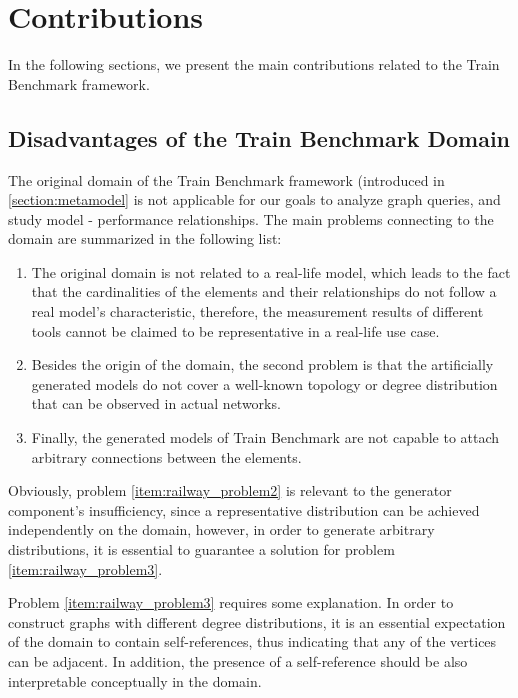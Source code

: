 \chapter{Contributions}

In the following sections, we present the main contributions related to the Train Benchmark framework.

\section{Disadvantages of the Train Benchmark Domain}\label{sec:railway}

The original domain of the Train Benchmark framework (introduced in \ref{section:metamodel} is not applicable for our goals to analyze graph queries, and study model - performance relationships. The main problems connecting to the domain are summarized in the following list:
\begin{enumerate}
	\item The original domain is not related to a real-life model, which leads to the fact that the cardinalities of the elements and their relationships do not follow a real model's characteristic, therefore, the measurement results of different tools cannot be claimed to be representative in a real-life use case. \label{item:railway_problem1}
	\item Besides the origin of the domain, the second problem is that the artificially generated models do not cover a well-known topology or degree distribution that can be observed in actual networks. \label{item:railway_problem2}
	\item Finally, the generated models of Train Benchmark are not capable to attach arbitrary connections between the elements. \label{item:railway_problem3}
\end{enumerate}

Obviously, problem \ref{item:railway_problem2} is relevant to the generator component's insufficiency, since a representative distribution can be achieved independently on the domain, however, in order to generate arbitrary distributions, it is essential to guarantee a solution for problem \ref{item:railway_problem3}.

Problem \ref{item:railway_problem3} requires some explanation. In order to construct graphs with different degree distributions, it is an essential expectation of the domain to contain self-references, thus indicating that any of the vertices can be adjacent. In addition, the presence of a self-reference should be also interpretable conceptually in the domain. %

